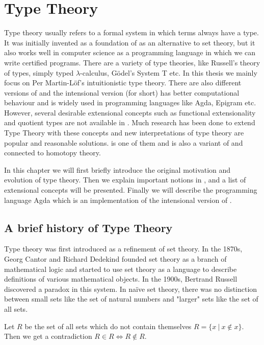 \chapter{Type Theory}
\label{bg}

Type theory usually refers to a formal system in which terms always have a type. It was initially invented as a foundation of \maths as an alternative to set theory, but it also works well in computer science as a programming language in which we can write certified programs. There are a variety of type theories, like Russell's theory of types, simply typed $\lambda$-calculus, Gödel's System T \cite{gdl:1931} etc. In this thesis we mainly focus on Per Martin-L\"{o}f's intuitionistic type theory. There are also different versions of \mltt and the intensional version (\itt for short) has better computational behaviour and is widely used in programming languages like Agda, Epigram etc. However, several desirable extensional concepts such as functional extensionality and quotient types are not available in \itt. Much research has been done to extend Type Theory with these concepts and new interpretations of type theory are popular and reasonable solutions. \hott is one of them and is also a variant of \mltt and connected to homotopy theory. 


In this chapter we will first briefly introduce the original motivation and evolution of type theory. Then we explain important notions in \mltt, and a list of extensional concepts will be presented. Finally we will describe the programming language Agda which is an implementation of the intensional version of \mltt.


\section{A brief history of Type Theory}

Type theory was first introduced as a refinement of set theory. 
In the 1870s, Georg Cantor and Richard Dedekind founded set theory as a branch of mathematical logic and started to use set theory as a language to describe definitions of various mathematical objects.
In the 1900s, Bertrand Russell discovered a paradox in this system. In naïve set theory, there was no distinction between small sets like the set of natural numbers and "larger" sets like the set of all sets.

\begin{example}
Let $R$ be the set of all sets which do not contain themselves
$R = \{x ~| ~x \not\in  x\}$.
Then we get a contradiction
$R \in R \iff R \not\in R$.
\end{example}

